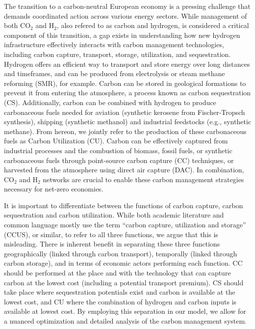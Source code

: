 \documentclass[twocolumn]{article}
\newcommand{\COtwo}{CO$_2$}
\newcommand{\Htwo}{H$_2$}
\begin{document}
The transition to a carbon-neutral European economy is a pressing challenge that demands coordinated action across various energy sectors. While management of both \COtwo{} and \Htwo{}, also refered to as carbon and hydrogen, is considered a critical component of this transition, a gap exists in understanding how new hydrogen infrastructure effectively interacts with carbon management technologies, including carbon capture, transport, storage, utilization, and sequestration. Hydrogen offers an efficient way to transport and store energy over long distances and timeframes, and can be produced from electrolysis or steam methane reforming (SMR), for example. Carbon can be stored in geological formations to prevent it from entering the atmosphere, a process known as carbon sequestration (CS). Additionally, carbon can be combined with hydrogen to produce carbonaceous fuels needed for aviation (synthetic kerosene from Fischer-Tropsch synthesis), shipping (synthetic methanol) and industrial feedstocks (e.g., synthetic methane). From hereon, we jointly refer to the production of these carbonaceous fuels as Carbon Utilization (CU). Carbon can be effectively captured from industrial processes and the combustion of biomass, fossil fuels, or synthetic carbonaceous fuels through point-source carbon capture (CC) techniques, or harvested from the atmosphere using direct air capture (DAC). In combination, \COtwo{} and \Htwo{} networks are crucial to enable these carbon management strategies necessary for net-zero economies.

It is important to differentiate between the functions of carbon capture, carbon sequestration and carbon utilization. While both academic literature and common language mostly use the term ``carbon capture, utilization and storage'' (CCUS), or similar, to refer to all three functions, we argue that this is misleading. There is inherent benefit in separating these three functions geographically (linked through carbon transport), temporally (linked through carbon storage), and in terms of economic actors performing each function. CC should be performed at the place and with the technology that can capture carbon at the lowest cost (including a potential transport premium). CS should take place where sequestration potentials exist and carbon is available at the lowest cost, and CU where the combination of hydrogen and carbon inputs is available at lowest cost. By employing this separation in our model, we allow for a nuanced optimization and detailed analysis of the carbon management system.
\end{document}
